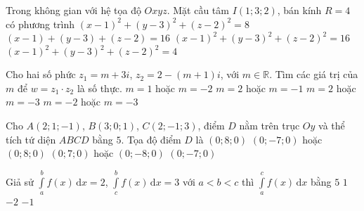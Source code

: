 \begin{ex}%
	Trong không gian với hệ tọa độ $Oxyz$. Mặt cầu tâm $I(1;3;2)$, bán kính $R=4$ có phương trình
	\choice
	{$(x-1)^2+(y-3)^2+(z-2)^2=8$}
	{$(x-1)+(y-3)+(z-2)=16$}
	{\True $(x-1)^2+(y-3)^2+(z-2)^2=16$}
	{$(x-1)^2+(y-3)^2+(z-2)^2=4$}
\end{ex}
\begin{ex}%
	Cho hai số phức $z_1=m+3i$, $z_2=2-(m+1)i$, với $m\in\mathbb{R}$. Tìm các giá trị của $m$ để $w=z_1\cdot z_2$ là số thực. 
	\choice
	{$m=1$ hoặc $m=-2$}
	{$m=2$ hoặc $m=-1$}
	{\True $m=2$ hoặc $m=-3$}
	{$m=-2$ hoặc $m=-3$}
\end{ex}
\begin{ex}%
	Cho $A(2;1;-1)$, $B(3;0;1)$, $C(2;-1;3)$, điểm $D$ nằm trên trục $Oy$ và thể tích tứ diện $ABCD$ bằng $5$. Tọa độ điểm $D$ là
	\choice
	{$(0;8;0)$}
	{\True $(0;-7;0)$ hoặc $(0;8;0)$}
	{$(0;7;0)$ hoặc $(0;-8;0)$}
	{$(0;-7;0)$}
\end{ex}
\begin{ex}%
	Giả sử $\displaystyle\int\limits_a^bf(x)\mathrm{\,d}x=2$, $\displaystyle\int\limits_c^bf(x)\mathrm{\,d}x=3$ với $a<b<c$ thì $\displaystyle\int\limits_a^cf(x)\mathrm{\,d}x$ bằng
	\choice
	{$5$}
	{$1$}
	{$-2$}
	{\True $-1$}
\end{ex}
